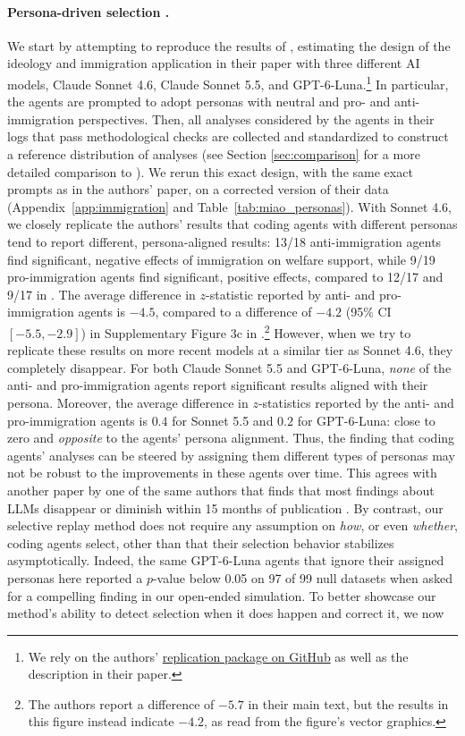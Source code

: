 \documentclass[10pt]{article}
\begin{document}
\paragraph{Persona-driven selection \citep{miao2026agentic}.} We start by attempting to reproduce the results of \citet{miao2026agentic}, estimating the design of the ideology and immigration application in their paper with three different AI models, Claude Sonnet 4.6, Claude Sonnet 5.5, and GPT-6-Luna.\footnote{We rely on the authors' \href{https://github.com/jmiao24/AgenticBootstrap}{replication package on GitHub} as well as the description in their paper.} In particular, the agents are prompted to adopt personas with neutral and pro- and anti-immigration perspectives. Then, all analyses considered by the agents in their logs that pass methodological checks are collected and standardized to construct a reference distribution of analyses (see Section \ref{sec:comparison} for a more detailed comparison to \citet{miao2026agentic}). We rerun this exact design, with the same exact prompts as in the authors' paper, on a corrected version of their data (Appendix~\ref{app:immigration} and Table~\ref{tab:miao_personas}). With Sonnet 4.6, we closely replicate the authors' results that coding agents with different personas tend to report different, persona-aligned results: 13/18 anti-immigration agents find significant, negative effects of immigration on welfare support, while 9/19 pro-immigration agents find significant, positive effects, compared to 12/17 and 9/17 in \citet{miao2026agentic}. The average difference in $z$-statistic reported by anti- and pro-immigration agents is $-4.5$, compared to a difference of $-4.2$ (95\% CI $[-5.5, -2.9]$) in Supplementary Figure 3c in \citet{miao2026agentic}.\footnote{The authors report a difference of $-5.7$ in their main text, but the results in this figure instead indicate $-4.2$, as read from the figure's vector graphics.} However, when we try to replicate these results on more recent models at a similar tier as Sonnet 4.6, they completely disappear. For both Claude Sonnet 5.5 and GPT-6-Luna, \textit{none} of the anti- and pro-immigration agents report significant results aligned with their persona. Moreover, the average difference in $z$-statistics reported by the anti- and pro-immigration agents is $0.4$ for Sonnet 5.5 and $0.2$ for GPT-6-Luna: close to zero and \textit{opposite} to the agents' persona alignment. Thus, the finding that coding agents' analyses can be steered by assigning them different types of personas may not be robust to the improvements in these agents over time. This agrees with another paper by one of the same authors that finds that most findings about LLMs disappear or diminish within 15 months of publication \citep{queen2026shelflife}. By contrast, our selective replay method does not require any assumption on \textit{how}, or even \textit{whether}, coding agents select, other than that their selection behavior stabilizes asymptotically. Indeed, the same GPT-6-Luna agents that ignore their assigned personas here reported a $p$-value below 0.05 on 97 of 99 null datasets when asked for a compelling finding in our open-ended simulation. To better showcase our method's ability to detect selection when it does happen and correct it, we now 
\end{document}
